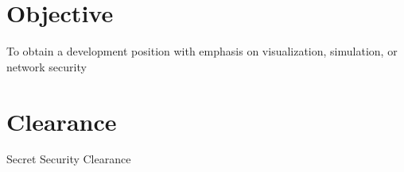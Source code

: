 \documentclass[margin,line]{resume}
\begin{document}
\address{813 Troy Rd\\Edwardsville\\IL 62025 $\bullet$ (618) 530-0659 $\bullet$ jcook@siue.edu}
\begin{resume}
\section{Objective}
To obtain a development position with emphasis on visualization, simulation, or network security
\section{Clearance}
Secret Security Clearance

\end{resume}
\end{document}
